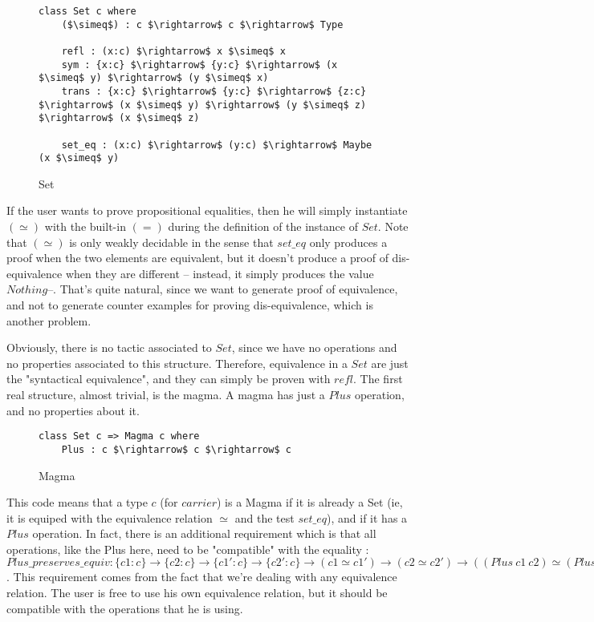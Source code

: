 \begin{figure}[H]
\figrule
\begin{center}
\begin{lstlisting}
class Set c where
    ($\simeq$) : c $\rightarrow$ c $\rightarrow$ Type

    refl : (x:c) $\rightarrow$ x $\simeq$ x
    sym : {x:c} $\rightarrow$ {y:c} $\rightarrow$ (x $\simeq$ y) $\rightarrow$ (y $\simeq$ x)
    trans : {x:c} $\rightarrow$ {y:c} $\rightarrow$ {z:c} $\rightarrow$ (x $\simeq$ y) $\rightarrow$ (y $\simeq$ z) $\rightarrow$ (x $\simeq$ z)    
    
    set_eq : (x:c) $\rightarrow$ (y:c) $\rightarrow$ Maybe (x $\simeq$ y)
\end{lstlisting}
\end{center}
\caption{Set}
\label{Set}
\figrule
\end{figure}
If the user wants to prove propositional equalities, then he will simply instantiate $(\simeq)$ with the built-in $(=)$ during the definition of the instance of $Set$.
Note that $(\simeq)$ is only weakly decidable in the sense that $set\_eq$ only produces a proof when the two elements are equivalent, but it doesn't produce a proof of dis-equivalence when they are different -- instead, it simply produces the value $Nothing$--. That's quite natural, since we want to generate proof of equivalence, and not to generate counter examples for proving dis-equivalence, which is another problem.

Obviously, there is no tactic associated to $Set$, since we have no operations and no properties associated to this structure. Therefore, equivalence in a $Set$ are just the "syntactical equivalence", and they can simply be proven with $refl$.
The first real structure, almost trivial, is the magma. A magma has just a $Plus$ operation, and no properties about it.

\begin{figure}[H]
\figrule
\begin{center}
\begin{lstlisting}
class Set c => Magma c where
    Plus : c $\rightarrow$ c $\rightarrow$ c
\end{lstlisting}
\end{center}
\caption{Magma}
\label{Magma}
\figrule
\end{figure}

This code means that a type $c$ (for $carrier$) is a Magma if it is already a Set (ie, it is equiped with the equivalence relation $\simeq$ and the test $set\_eq$), and if it has a $Plus$ operation.
In fact, there is an additional requirement which is that all operations, like the Plus here, need to be "compatible" with the equality : $Plus\_preserves\_equiv : \{c1:c\} \rightarrow \{c2:c\} \rightarrow \{c1':c\} \rightarrow \{c2':c\} \rightarrow (c1 \simeq c1') \rightarrow (c2 \simeq c2') \rightarrow ((Plus\ c1\ c2) \simeq (Plus\ c1'\ c2'))$. This requirement comes from the fact that we're dealing with any equivalence relation. The user is free to use his own equivalence relation, but it should be compatible with the operations that he is using.

